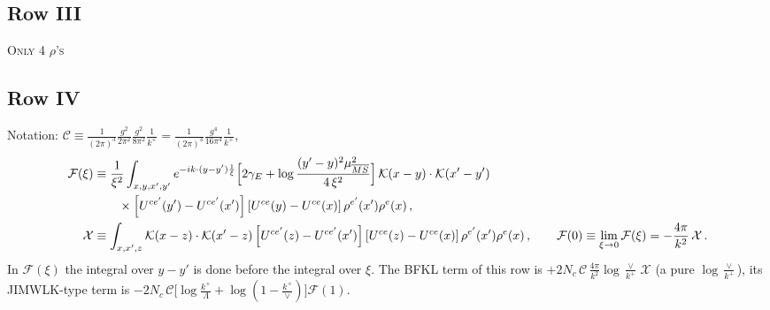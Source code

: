 \documentclass[9pt]{article}
\numberwithin{equation}{section}
\begin{document}
\subsection{Row III}
\textsc{Only 4 $\rho$'s}
\subsection{Row IV}
\noindent Notation: $\mathcal{C}\equiv\frac{1}{(2\pi)^{3}}\frac{g^{2}}{2\pi^{2}}\frac{g^{2}}{8\pi^{2}}\frac{1}{k^{+}}=\frac{1}{(2\pi)^{3}}\frac{g^{4}}{16\pi^{4}}\frac{1}{k^{+}}$,
\begin{align}
\mathcal{F}(\xi) & \equiv\frac{1}{\xi^{2}}\int_{x,y,x',y'}e^{-ik\cdot(y-y')\frac{1}{\xi}}\Big[2\gamma_{E}+\log\frac{(y'-y)^{2}\mu^{2}_{\overline{MS}}}{4\,\xi^{2}}\Big]\,\mathcal{K}(x-y)\cdot\mathcal{K}(x'-y')\notag\\ & \qquad\times\left[U^{ce'}(y') - U^{ce'}(x')\right]\left[U^{ce}(y) - U^{ce}(x)\right]\rho^{e'}(x')\rho^{e}(x)\,,\notag\\
\mathcal{X} & \equiv\int_{x,x',z}\mathcal{K}(x-z)\cdot\mathcal{K}(x'-z)\left[U^{ce'}(z) - U^{ce'}(x')\right]\left[U^{ce}(z) - U^{ce}(x)\right]\rho^{e'}(x')\rho^{e}(x)\,,\qquad \mathcal{F}(0)\equiv\lim_{\xi\to0}\mathcal{F}(\xi)=-\frac{4\pi}{k^{2}}\,\mathcal{X}\,.\notag
\end{align}
In $\mathcal{F}(\xi)$ the integral over $y-y'$ is done before the integral over $\xi$. The BFKL term of this row is $+2N_{c}\,\mathcal{C}\,\frac{4\pi}{k^{2}}\log\frac{\vee}{k^{+}}\,\mathcal{X}$ (a pure $\log\frac{\vee}{k^{+}}$), its JIMWLK-type term is $-2N_{c}\,\mathcal{C}\big[\log\frac{k^{+}}{\Lambda}+\log(1-\frac{k^{+}}{\vee})\big]\mathcal{F}(1)$.
\end{document}
